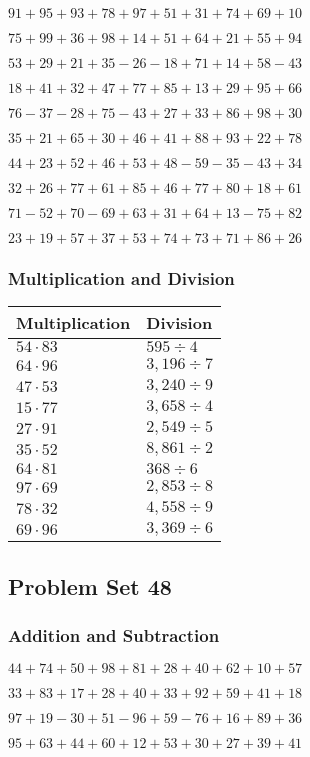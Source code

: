 \(91+95+93+78+97+51+31+74+69+ 10\)

\(75+99+36+98+14+51+64+21+55+94\)

\(53+29+21+35-26-18+71+14+58-43\)

\(18+41+32+47+77+85+13+29+95+66\)

\(76-37-28+75-43+27+33+86+98+30\)

\(35+21+65+30+46+41+88+93+22+78\)

\(44+23+52+46+53+48-59-35-43+34\)

\(32+26+77+61+85+46+77+80+18+61\)

\(71-52+70-69+63+31+64+13-75+82\)

\(23+19+57+37+53+74+73+71+86+26\)

\hypertarget{multiplication-and-division-87}{%
\subsubsection{Multiplication and
Division}\label{multiplication-and-division-87}}

\begin{longtable}[]{@{}ll@{}}
\toprule
Multiplication & Division\tabularnewline
\midrule
\endhead
\(54\cdot83\) & \(595÷4\)\tabularnewline
\(64\cdot96\) & \(3,196÷7\)\tabularnewline
\(47\cdot53\) & \(3,240÷9\)\tabularnewline
\(15\cdot77\) & \(3,658÷4\)\tabularnewline
\(27\cdot91\) & \(2,549÷5\)\tabularnewline
\(35\cdot52\) & \(8,861÷2\)\tabularnewline
\(64\cdot81\) & \(368÷6\)\tabularnewline
\(97\cdot69\) & \(2,853÷8\)\tabularnewline
\(78\cdot32\) & \(4,558÷9\)\tabularnewline
\(69\cdot96\) & \(3,369÷6\)\tabularnewline
\bottomrule
\end{longtable}

\hypertarget{problem-set-48}{%
\subsection{Problem Set 48}\label{problem-set-48}}

\hypertarget{addition-and-subtraction-88}{%
\subsubsection{Addition and
Subtraction}\label{addition-and-subtraction-88}}

\(44+74+50+98+81+28+40+62+10+ 57\)

\(33+83+17+28+40+33+92+59+41+18\)

\(97+19-30+51-96+59-76+16+89+36\)

\(95+63+44+60+12+53+30+27+39+41\)

